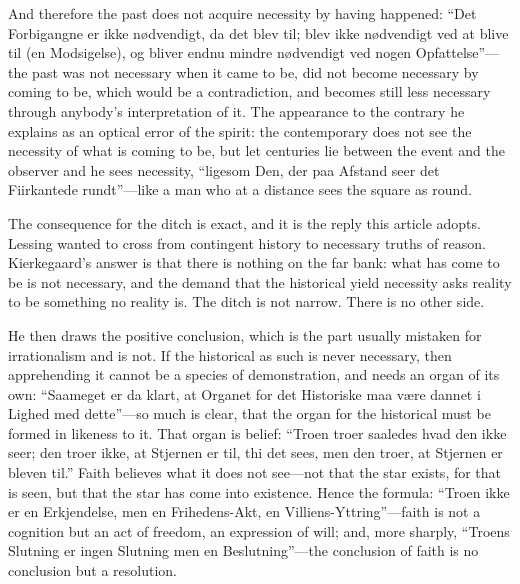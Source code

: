 And therefore the past does not acquire necessity by having happened: ``Det Forbigangne er ikke n\o dvendigt, da det blev til; blev ikke n\o dvendigt ved at blive til (en Modsigelse), og bliver endnu mindre n\o dvendigt ved nogen Opfattelse''---the past was not necessary when it came to be, did not become necessary by coming to be, which would be a contradiction, and becomes still less necessary through anybody's interpretation of it. The appearance to the contrary he explains as an optical error of the spirit: the contemporary does not see the necessity of what is coming to be, but let centuries lie between the event and the observer and he sees necessity, ``ligesom Den, der paa Afstand seer det Fiirkantede rundt''---like a man who at a distance sees the square as round.

The consequence for the ditch is exact, and it is the reply this article adopts. Lessing wanted to cross from contingent history to necessary truths of reason. Kierkegaard's answer is that there is nothing on the far bank: what has come to be is not necessary, and the demand that the historical yield necessity asks reality to be something no reality is. The ditch is not narrow. There is no other side.

He then draws the positive conclusion, which is the part usually mistaken for irrationalism and is not. If the historical as such is never necessary, then apprehending it cannot be a species of demonstration, and needs an organ of its own: ``Saameget er da klart, at Organet for det Historiske maa v\ae re dannet i Lighed med dette''---so much is clear, that the organ for the historical must be formed in likeness to it. That organ is belief: ``Troen troer saaledes hvad den ikke seer; den troer ikke, at Stjernen er til, thi det sees, men den troer, at Stjernen er bleven til.'' Faith believes what it does not see---not that the star exists, for that is seen, but that the star has come into existence. Hence the formula: ``Troen ikke er en Erkjendelse, men en Frihedens-Akt, en Villiens-Yttring''---faith is not a cognition but an act of freedom, an expression of will; and, more sharply, ``Troens Slutning er ingen Slutning men en Beslutning''---the conclusion of faith is no conclusion but a resolution.

